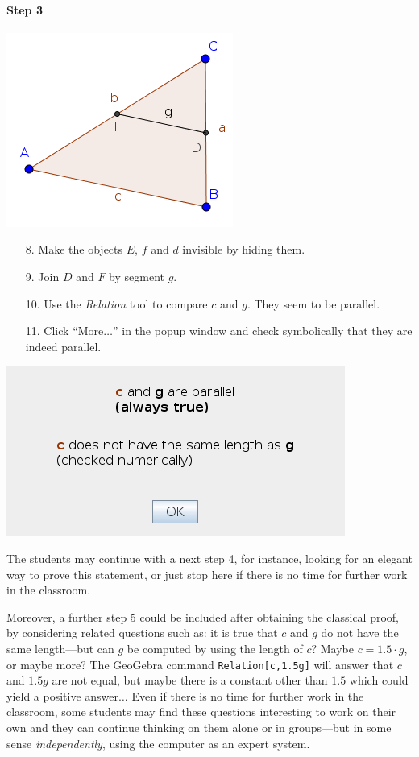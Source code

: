 \documentclass{article}
\begin{document}
\paragraph{Step 3}
\begin{center}
\includegraphics[scale=0.5]{classroom3}
\end{center}
\begin{enumerate}
    \item[8.] Make the objects $E$, $f$ and $d$ invisible by hiding them.
    \item[9.] Join $D$ and $F$ by segment $g$.
    \item[10.] Use the \textit{Relation} tool to compare $c$ and $g$. They seem to be parallel.
    \item[11.] Click ``More$\ldots$'' in the popup window and check symbolically that they are indeed parallel.
\end{enumerate}
\begin{center}
\includegraphics[scale=0.5]{classroom3-Relation}
\end{center}
The students may continue with a next step 4, for instance,  looking for an elegant way to prove this statement, or just stop here if there is no time for further work in the classroom.

Moreover, a further step 5 could be included after obtaining the classical proof, by considering related questions such as: it is true that $c$ and $g$ do not have the same length---but can $g$ be computed by using the length of $c$? Maybe $c=1.5\cdot g$, or maybe more? The GeoGebra command \texttt{Relation[c,1.5g]} will  answer that $c$ and $1.5g$ are not equal, but maybe there is a constant other than $1.5$ which could yield a positive answer$\ldots$ Even if there is no time for further work in the classroom, some students may find these questions interesting to work on their own and they can continue thinking on them alone or in groups---but in some sense \textit{independently}, using the computer as an expert system.
\end{document}
